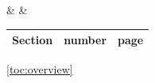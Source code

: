 \begin{center}
             {}
             {\etociffirst{\\\hline\hline}{\\\hline}}
             {\etocname & \etocnumber & \etocpage }
             {}

\etocsettocstyle
   {\hypersetup{hidelinks}\begin{tabular}{|p{4cm}|c|c|}\hline
    \multicolumn{1}{|c|}{\bfseries Section}&
    \bfseries number&
    \bfseries page}
   {\\\hline\end{tabular}}

\etocglobaldefs %

\tableofcontents\ref{toc:overview}
\end{center}
